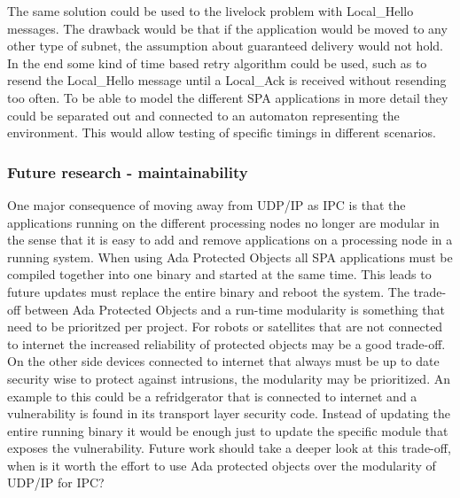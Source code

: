 The same solution could be used to the livelock problem with Local\_Hello
messages. The drawback would be that if the application would be moved to any
other type of subnet, the assumption about guaranteed delivery would not hold.
In the end some kind of time based retry algorithm could be used, such as to
resend the Local\_Hello message until a Local\_Ack is received without
resending too often. To be able to model the different SPA applications in more
detail they could be separated out and connected to an automaton representing
the environment.  This would allow testing of specific timings in different
scenarios.

%

\subsubsection{Future research - maintainability}
One major consequence of moving away from UDP/IP as IPC is that the
applications running on the different processing nodes no longer are modular in
the sense that it is easy to add and remove applications on a processing node
in a running system. When using Ada Protected Objects all SPA applications must
be compiled together into one binary and started at the same time. This leads
to future updates must replace the entire binary and reboot the system. The
trade-off between Ada Protected Objects and a run-time modularity is something
that need to be prioritzed per project. For robots or satellites that are not
connected to internet the increased reliability of protected objects may be a
good trade-off. On the other side devices connected to internet that always
must be up to date security wise to protect against intrusions, the modularity
may be prioritized.  An example to this could be a refridgerator that is
connected to internet and a vulnerability is found in its transport layer
security code. Instead of updating the entire running binary it would be enough
just to update the specific module that exposes the vulnerability. Future work
should take a deeper look at this trade-off, when is it worth the effort to use
Ada protected objects over the modularity of UDP/IP for IPC?


